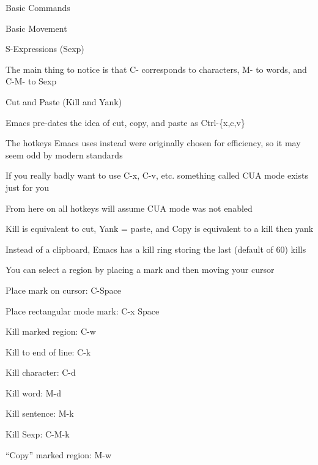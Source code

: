 \documentclass[presentation]{beamer}
\begin{document}
\begin{frame}[label=sec-2]{Basic Commands}
\begin{block}{Basic Movement}
\begin{block}{S-Expressions (Sexp)}
\begin{block}{The main thing to notice is that C- corresponds to characters, M- to words, and C-M- to Sexp}
\end{block}
\end{block}
\begin{block}{Cut and Paste (Kill and Yank)}
\begin{block}{Emacs pre-dates the idea of cut, copy, and paste as Ctrl-\{x,c,v\}}
\end{block}
\begin{block}{The hotkeys Emacs uses instead were originally chosen for efficiency, so it may seem odd by modern standards}
\begin{block}{If you really badly want to use C-x, C-v, etc. something called CUA mode exists just for you}
\end{block}
\begin{block}{From here on all hotkeys will assume CUA mode was not enabled}
\end{block}
\end{block}
\begin{block}{Kill is equivalent to cut, Yank = paste, and Copy is equivalent to a kill then yank}
\end{block}
\begin{block}{Instead of a clipboard, Emacs has a kill ring storing the last (default of 60) kills}
\end{block}
\begin{block}{You can select a region by placing a mark and then moving your cursor}
\end{block}
\begin{block}{Place mark on cursor: C-Space}
\end{block}
\begin{block}{Place rectangular mode mark: C-x Space}
\end{block}
\begin{block}{Kill marked region: C-w}
\end{block}
\begin{block}{Kill to end of line: C-k}
\end{block}
\begin{block}{Kill character: C-d}
\end{block}
\begin{block}{Kill word: M-d}
\end{block}
\begin{block}{Kill sentence: M-k}
\end{block}
\begin{block}{Kill Sexp: C-M-k}
\end{block}
\begin{block}{``Copy'' marked region: M-w}

\end{block}
\end{block}
\end{block}
\end{frame}
\end{document}
